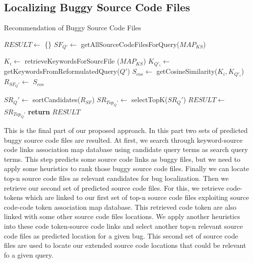 \documentclass{sig-alternate}
\begin{document}
\subsection{Localizing Buggy Source Code Files} 


\begin{algorithm}[!t]
\caption{Recommendation of Buggy Source Code Files}
\label{localization}
\begin{algorithmic}[1]
\State $RESULT \gets$ \{\}
\State $SF_{Q'} \gets$ getAllSourceCodeFilesForQuery($MAP_{KS}$)


\State $K_{i} \gets$ retrieveKeywordsForSourcFile ($MAP_{KS}$)
\State $K_{Q'_i} \gets$ getKeywordsFromReformulatedQuery($Q'$)
\State $S_{cos} \gets$ getCosineSimilarity($K_{i}, K_{Q'_i}$) 
\State $R_{SF_Q'} \gets$ $S_{cos}$

\EndFor
{}
\State $SR_Q' \gets$ sortCandidates($R_{SF}$)
\State $SR_{Top_Q'} \gets$ selectTopK($SR_Q'$)
\State $RESULT \gets$ $SR_{Top_Q'}$ 
\State \textbf{return} $RESULT$
\EndProcedure
\end{algorithmic}
\end{algorithm}


This is the final part of our proposed approach. In this part two sets of predicted buggy source code files are resulted. At first, we search through keyword-source code links association map database using candidate query terms as search query terms. This step predicts some source code links as buggy files, but we need to apply some heuristics to rank those buggy source code files. Finally we can locate top-n source code files as relevant candidates for bug localization. Then we retrieve our second set of predicted source code files. For this, we retrieve code-tokens which are linked to our first set of top-n source code files exploiting source code-code token association map database. This retrieved code token are also linked with some other source code files locations. We apply another heuristics into these code token-source code links and select another top-n relevant source code files as predicted location for a given bug. This second set of source code files are used to locate our extended source code locations that could be relevant fo a given query.
\end{document}
